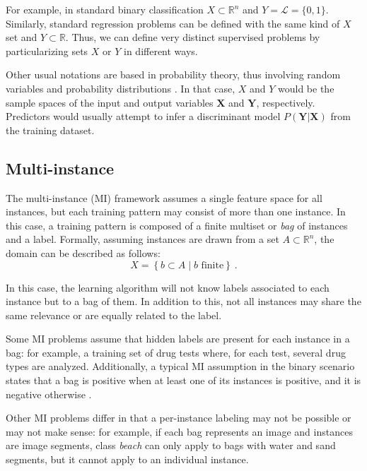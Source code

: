 For example, in standard binary classification $X\subset\mathbb R^n$ and $Y=\mathcal L=\{0, 1\}$. Similarly, standard regression problems can be defined with the same kind of $X$ set and $Y\subset \mathbb R$. Thus, we can define very distinct supervised problems by particularizing sets $X$ or $Y$ in different ways.

Other usual notations are based in probability theory, thus involving random variables and probability distributions \cite{gaussianproc,learning-murphy}. In that case, $X$ and $Y$ would be the sample spaces of the input and output variables $\mathbf X$ and $\mathbf Y$, respectively. Predictors would usually attempt to infer a discriminant model $P(\mathbf Y|\mathbf X)$ from the training dataset.

\subsection{Multi-instance}
\label{p3sec:minstance}

The multi-instance (MI) framework \cite{mil} assumes a single feature space for all instances, but each training pattern may consist of more than one instance. In this case, a training pattern is composed of a finite multiset or \emph{bag} of instances and a label. Formally, assuming instances are drawn from a set $A\subset\mathbb R^n$, the domain can be described as follows:
\begin{equation}
  X=\left\{b\subset A\mid b \mbox{ finite}\right\}~.
  \end{equation} 

In this case, the learning algorithm will not know labels associated to each instance but to a bag of them. In addition to this, not all instances may share the same relevance or are equally related to the label.

Some MI problems assume that hidden labels are present for each instance in a bag: for example, a training set of drug tests where, for each test, several drug types are analyzed. Additionally, a typical MI assumption in the binary scenario states that a bag is positive when at least one of its instances is positive, and it is negative otherwise \cite{mil-assumptions}.

Other MI problems differ in that a per-instance labeling may not be possible or may not make sense: for example, if each bag represents an image and instances are image segments, class \emph{beach} can only apply to bags with water and sand segments, but it cannot apply to an individual instance.


